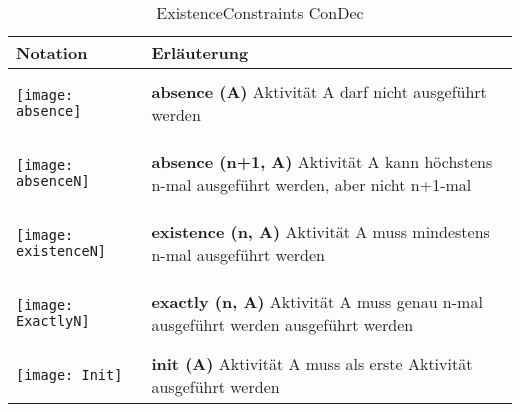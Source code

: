  \begin{table}[H]
 \begin{tabular}{|p{}|p{}|}
\hline
\textbf{Notation} & \textbf{Erläuterung}\\
\hline
\begin{center}
  \texttt{[image: absence]} %
  \end{center}
& \textbf{absence (A)} \newline
Aktivität A darf nicht ausgeführt werden

\\



\hline
\begin{center}

  \texttt{[image: absenceN]} %
    \end{center}

& \textbf{absence (n+1, A)} \newline
Aktivität A kann höchstens n-mal ausgeführt werden, aber nicht n+1-mal

\\
\hline
\begin{center}

  \texttt{[image: existenceN]} %
    \end{center}

& \textbf{existence (n, A)}\newline
Aktivität A muss mindestens n-mal ausgeführt werden

\\
\hline
\begin{center}

  \texttt{[image: ExactlyN]} %
    \end{center}

& \textbf{exactly (n, A)}\newline
Aktivität A muss genau n-mal ausgeführt werden ausgeführt werden

\\
\hline

\begin{center}

  \texttt{[image: Init]} %
    \end{center}

& \textbf{init (A)}\newline
Aktivität A muss als erste Aktivität ausgeführt werden

\\
\hline

\end{tabular}
 \caption{ExistenceConstraints ConDec}
\label{tab:existence}
\end{table}

